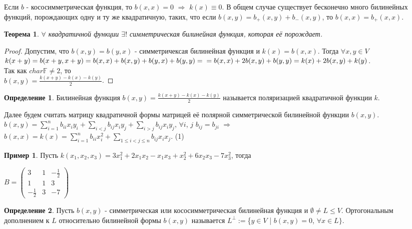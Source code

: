 \documentclass[a4paper, 12pt]{article}
\newcommand{\F}{\mathbb F}
\theoremstyle{definition}
\newtheorem*{definition}{Определение}
\newtheorem*{example1}{Пример}
\theoremstyle{plain}
\newtheorem*{theorem}{Теорема}
\theoremstyle{remark}
\begin{document}
  Если $b$ - кососимметрическая функция, то $b(x,x)=0$ $\Longrightarrow$ $k(x)\equiv0$. В общем случае существует бесконечно много билинейных функций, порождающих одну и ту же квадратичную, таких, что если $b(x,y)=b_+(x,y)+b_-(x,y)$, то $b(x,x)=b_+(x,x)$.
  \begin{theorem}
    $\forall$ квадратичной функции $\exists!$ симметрическая билинейная функция, которая её порождает.
  \end{theorem}
  \begin{proof}
    Допустим, что $b(x,y) = b(y,x)$ - симметричексая билинейная функция и $k(x) = b(x,x)$. Тогда $\forall x, y\in V$\\ 
    $k(x+y) = b(x+y, x+y) = b(x,x)+b(x,y)+b(y,x)+b(y,y)=\\ = b(x,x)+2b(x,y)+b(y,y) = k(x)+2b(x,y)+k(y)$.
    \\ Так как $char\F\neq2$, то\\ $b(x,y)=\frac{k(x+y)-k(x)-k(y)}{2}$.
  \end{proof}
  \begin{definition}
    Билинейная функция $b(x,y) = \frac{k(x+y)-k(x)-k(y)}{2}$ называется поляризацией квадратичной функции $k$.
  \end{definition}
  Далее будем считать матрицу квадратичной формы матрицей её полярной симметрической билинейной функции $b(x,y)$.\\
  $b(x,y)=\sum\limits_{i=1}^nb_{ii}x_iy_i+\sum\limits_{i<j}b_{ij}x_iy_j+\sum\limits_{i>j}b_{ij}x_iy_j$, $\forall i$, $j$ $b_{ij}=b_{ji}$ $\Longrightarrow$\\
  $b(x,x)=k(x)=\sum\limits_{i=1}^nb_{ii}x_i^2+\sum\limits_{1\leqslant i<j\leqslant n}b_{ij}x_ix_j$.  (1)
  \begin{example1}
    Пусть $k(x_1,x_2, x_3)=3x_1^2+2x_1x_2-x_1x_3+x_2^2+6x_2x_3-7x_3^2$, тогда\\
    \begin{center}  
      $B=\begin{pmatrix}
        3 & 1 & -\frac{1}{2}\\
        1 & 1 &  3\\
        -\frac{1}{2} &  3 & -7
      \end{pmatrix}$
    \end{center}
  \end{example1}
  \begin{definition}
    Пусть $b(x,y)$ - симметрическая или кососимметрическая билинейная функция и $\emptyset\neq L\leqslant V$. Ортогональным дополнением к $L$ относительно билинейной формы $b(x,y)$ называется $L^{\perp}:=$\{$y\in V$ | $b(x,y)=0$, $\forall x\in L\}$.
  \end{definition}
\end{document}
